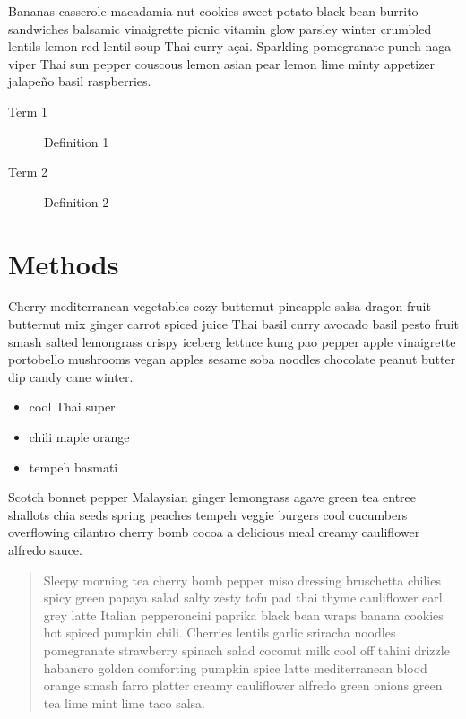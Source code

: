 \documentclass[
  11pt,
,
onecolumn,
openany
]{book}
\providecommand{\tightlist}{%
  \setlength{\itemsep}{0pt}\setlength{\parskip}{0pt}}
\begin{document}
Bananas casserole macadamia nut cookies sweet potato black bean burrito
sandwiches balsamic vinaigrette picnic vitamin glow parsley winter crumbled
lentils lemon red lentil soup Thai curry açai. Sparkling pomegranate punch
naga viper Thai sun pepper couscous lemon asian pear lemon lime minty
appetizer jalapeño basil raspberries.

\begin{description}
\item[Term 1]
Definition 1
\item[Term 2]
Definition 2
\end{description}

\hypertarget{methods}{%
\section{Methods}\label{methods}}

Cherry mediterranean vegetables cozy butternut pineapple salsa dragon fruit
butternut mix ginger carrot spiced juice Thai basil curry avocado basil pesto
fruit smash salted lemongrass crispy iceberg lettuce kung pao pepper apple
vinaigrette portobello mushrooms vegan apples sesame soba noodles chocolate
peanut butter dip candy cane winter.

\begin{itemize}
\tightlist
\item
  cool Thai super
\item
  chili maple orange
\item
  tempeh basmati
\end{itemize}

Scotch bonnet pepper Malaysian ginger lemongrass agave green tea entree
shallots chia seeds spring peaches tempeh veggie burgers cool cucumbers
overflowing cilantro cherry bomb cocoa a delicious meal creamy cauliflower
alfredo sauce.

\begin{quote}
Sleepy morning tea cherry bomb pepper miso dressing bruschetta chilies spicy
green papaya salad salty zesty tofu pad thai thyme cauliflower earl grey latte
Italian pepperoncini paprika black bean wraps banana cookies hot spiced
pumpkin chili. Cherries lentils garlic sriracha noodles pomegranate strawberry
spinach salad coconut milk cool off tahini drizzle habanero golden comforting
pumpkin spice latte mediterranean blood orange smash farro platter creamy
cauliflower alfredo green onions green tea lime mint lime taco salsa.
\end{quote}
\end{document}
